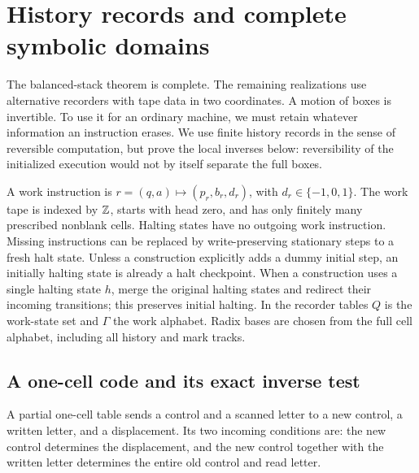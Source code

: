 \section{History records and complete symbolic domains}
\label{sec:bb-frontiers}

The balanced-stack theorem is complete.  The remaining realizations
use alternative recorders with tape data in two coordinates.
A motion of boxes is invertible.  To use it for an ordinary machine,
we must retain whatever information an instruction erases.  We use
finite history records in the sense of reversible computation, but
prove the local inverses below: reversibility of the initialized
execution would not by itself separate the full boxes.

A work instruction is $r=(q,a)\mapsto(p_r,b_r,d_r)$, with
$d_r\in\{-1,0,1\}$.  The work tape is indexed by $\mathbb Z$, starts with
head zero, and has only finitely many prescribed nonblank cells.
Halting states have no outgoing work instruction.  Missing instructions
can be replaced by write-preserving stationary steps to a fresh halt
state.  Unless a construction explicitly adds a dummy initial step,
an initially halting state is already a halt checkpoint. When a construction
uses a single halting state $h$, merge the original halting states and
redirect their incoming transitions; this preserves initial halting. In
the recorder tables $Q$ is the work-state set and $\Gamma$ the work
alphabet. Radix bases are chosen from the full cell alphabet, including
all history and mark tracks.

\subsection{A one-cell code and its exact inverse test}

A partial one-cell table sends a control and a scanned letter to a
new control, a written letter, and a displacement.  Its two incoming
conditions are: the new control determines the displacement, and the
new control together with the written letter determines the entire
old control and read letter.

